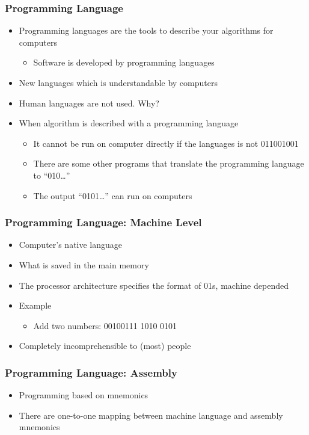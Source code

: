 \documentclass{../c-lecture}
\begin{document}
\begin{frame}
  \frametitle{Programming Language}
  \begin{itemize}
    \item
      Programming languages are the tools to describe your algorithms for
      computers
    \begin{itemize}
      \item Software is developed by programming languages
    \end{itemize}
    \item New languages which is understandable by computers
    \item Human languages are not used. Why?
    \item When algorithm is described with a programming language
    \begin{itemize}
      \item
        It cannot be run on computer directly if the languages is not 011001001
      \item
        There are some other programs that translate the programming language to
        ``010\ldots''
      \item The output ``0101\ldots'' can run on computers
    \end{itemize}
  \end{itemize}
\end{frame}

\begin{frame}
  \frametitle{Programming Language: Machine Level}
  \begin{itemize}
    \item Computer’s native language
    \item What is saved in the main memory
    \item
      The processor architecture specifies the format of 01s, machine depended
    \item Example
    \begin{itemize}
      \item Add two numbers: 00100111 1010 0101
    \end{itemize}
    \item Completely incomprehensible to (most) people
  \end{itemize}
\end{frame}

\begin{frame}
  \frametitle{Programming Language: Assembly}
  \begin{itemize}
    \item Programming based on mnemonics
    \item
      There are {\color{Orange} one-to-one mapping} between
      machine language and assembly mnemonics
  \end{itemize}
\end{frame}
\end{document}

